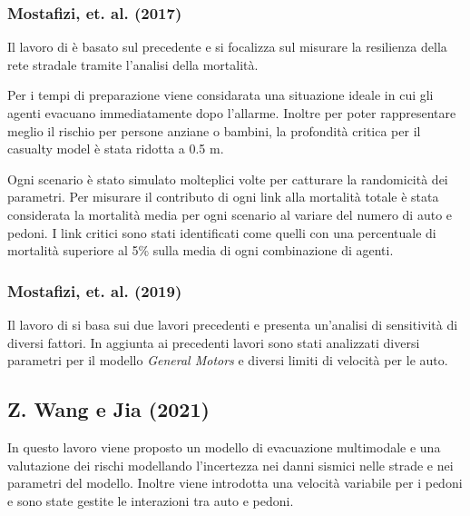 
\subsubsection*{Mostafizi, et. al. (2017)}
Il lavoro di \textcite{mostafizi2017agent} è basato sul precedente \parencite{wang2016agent} e si focalizza sul misurare la resilienza della rete stradale tramite l'analisi della mortalità.

Per i tempi di preparazione viene considarata una situazione ideale in cui gli agenti evacuano immediatamente dopo l'allarme. Inoltre per poter rappresentare
meglio il rischio per persone anziane o bambini, la profondità critica per il casualty model è stata ridotta a 0.5 m.

Ogni scenario è stato simulato molteplici volte per catturare la randomicità dei parametri. 
Per misurare il contributo di ogni link alla mortalità totale è stata considerata la mortalità media per ogni scenario al variare del numero di auto e pedoni.
I link critici sono stati identificati come quelli con una percentuale di mortalità superiore al 5\% sulla media di ogni combinazione di agenti.

\subsubsection*{Mostafizi, et. al. (2019)}
Il lavoro di \textcite{mostafizi2019agent} si basa sui due lavori precedenti e 
presenta un'analisi di sensitività di diversi fattori. 
In aggiunta ai precedenti lavori sono stati analizzati diversi parametri per 
il modello \textit{General Motors} e diversi limiti di velocità per le auto.


\subsection{Z. Wang e Jia (2021)}
In questo lavoro viene proposto un modello di evacuazione multimodale e una valutazione dei rischi modellando l'incertezza
nei danni sismici nelle strade e nei parametri del modello. Inoltre viene introdotta una velocità variabile per i pedoni e sono state 
gestite le interazioni tra auto e pedoni.


